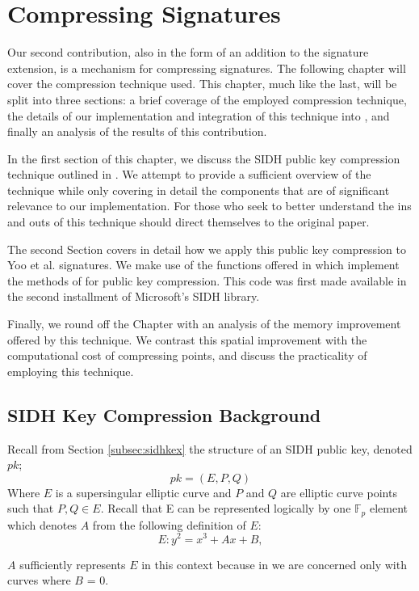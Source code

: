 \chapter{Compressing Signatures}
\label{sec:compress}

Our second contribution, also in the form of an addition to the \sidh signature extension, is a mechanism for compressing signatures. The following chapter will cover the compression technique used. This chapter, much like the last, will be split into three sections: a brief coverage of the employed compression technique, the details of our implementation and integration of this technique into \sidh, and finally an analysis of the results of this contribution.

In the first section of this chapter, we discuss the SIDH public key compression technique outlined in \cite{compwr}. We attempt to provide a sufficient overview of the technique while only covering in detail the components that are of significant relevance to our implementation. For those who seek to better understand the ins and outs of this technique should direct themselves to the original paper.  

The second Section covers in detail how we apply this public key compression to Yoo et al. signatures. We make use of the functions offered in \cite{pkcomp} which implement the methods of \cite{compwr} for public key compression. This code was first made available in the second installment of Microsoft's SIDH library.

Finally, we round off the Chapter with an analysis of the memory improvement offered by this technique. We contrast this spatial improvement with the computational cost of compressing points, and discuss the practicality of employing this technique. 

\section{SIDH Key Compression Background}

Recall from Section \ref{subsec:sidhkex} the structure of an SIDH public key, denoted $pk$;
$$
pk = (E, P, Q)
$$
Where $E$ is a supersingular elliptic curve and $P$ and $Q$ are elliptic curve points such that $P, Q \in E$. Recall that E can be represented logically by one $\mathbb{F}_{p}$ element which denotes $A$ from the following definition of $E$:
$$
E : y^2 = x^3 + Ax + B,
$$

$A$ sufficiently represents $E$ in this context because in \sidh we are concerned only with curves where $B$ = 0. 

